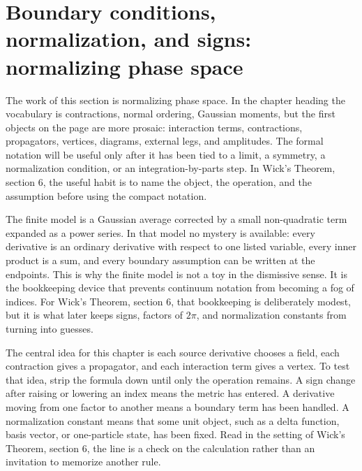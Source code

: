 \section{Boundary conditions, normalization, and signs: normalizing phase space}













The work of this section is normalizing phase space.  In the chapter heading the vocabulary is contractions, normal ordering, Gaussian moments, but the first objects on the page are more prosaic: interaction terms, contractions, propagators, vertices, diagrams, external legs, and amplitudes.  The formal notation will be useful only after it has been tied to a limit, a symmetry, a normalization condition, or an integration-by-parts step.  In Wick's Theorem, section 6, the useful habit is to name the object, the operation, and the assumption before using the compact notation.

The finite model is a Gaussian average corrected by a small non-quadratic term expanded as a power series.  In that model no mystery is available: every derivative is an ordinary derivative with respect to one listed variable, every inner product is a sum, and every boundary assumption can be written at the endpoints.  This is why the finite model is not a toy in the dismissive sense.  It is the bookkeeping device that prevents continuum notation from becoming a fog of indices.  For Wick's Theorem, section 6, that bookkeeping is deliberately modest, but it is what later keeps signs, factors of \(2\pi\), and normalization constants from turning into guesses.

The central idea for this chapter is each source derivative chooses a field, each contraction gives a propagator, and each interaction term gives a vertex.  To test that idea, strip the formula down until only the operation remains.  A sign change after raising or lowering an index means the metric has entered.  A derivative moving from one factor to another means a boundary term has been handled.  A normalization constant means that some unit object, such as a delta function, basis vector, or one-particle state, has been fixed.  Read in the setting of Wick's Theorem, section 6, the line is a check on the calculation rather than an invitation to memorize another rule.

